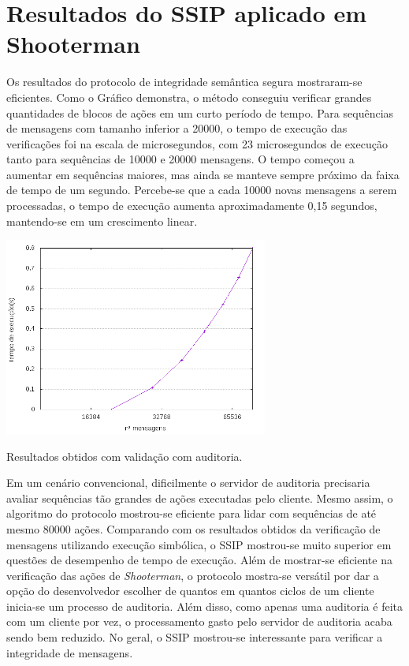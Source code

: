 \section{Resultados do SSIP aplicado em Shooterman}

Os resultados do protocolo de integridade semântica segura mostraram-se eficientes. Como o Gráfico \label{fig:resultaudit} demonstra, o método conseguiu verificar grandes quantidades de blocos de ações em um curto período de tempo. Para sequências de mensagens com tamanho inferior a 20000, o tempo de execução das verificações foi na escala de microsegundos, com 23 microsegundos de execução tanto para sequências de 10000 e 20000 mensagens. O tempo começou a aumentar em sequências maiores, mas ainda se manteve sempre próximo da faixa de tempo de um segundo. Percebe-se que a cada 10000 novas mensagens a serem processadas, o tempo de execução aumenta aproximadamente 0,15 segundos, mantendo-se em um crescimento linear.  

\begin{grafico}[h!]
	\begin{center}
	    \includegraphics[width=0.65\textwidth]{imagens/auditoria.png}
		\caption[Resultados obtidos com validação com auditoria.]{Resultados obtidos com validação com auditoria.}
		\label{fig:resultaudit}	
	\end{center}

\end{grafico}



Em um cenário convencional, dificilmente o servidor de auditoria precisaria avaliar sequências tão grandes de ações executadas pelo cliente. Mesmo assim, o algoritmo do protocolo mostrou-se eficiente para lidar com sequências de até mesmo 80000 ações. Comparando com os resultados obtidos da verificação de mensagens utilizando execução simbólica, o SSIP mostrou-se muito superior em questões de desempenho de tempo de execução. Além de mostrar-se eficiente na verificação das ações de \textit{Shooterman}, o protocolo mostra-se versátil por dar a opção do desenvolvedor escolher de quantos em quantos ciclos de um cliente inicia-se um processo de auditoria. Além disso, como apenas uma auditoria é feita com um cliente por vez, o processamento gasto pelo servidor de auditoria acaba sendo bem reduzido. No geral, o SSIP mostrou-se interessante para verificar a integridade de mensagens.

